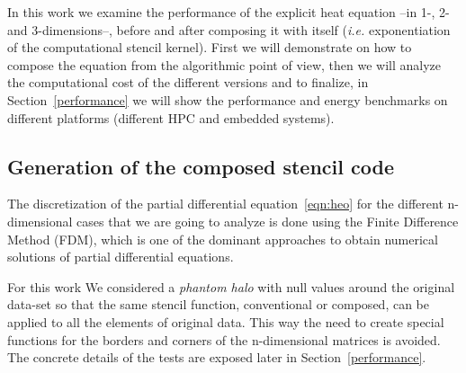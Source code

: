 \documentclass{acm_proc_article-sp}
\begin{document}
In this work we examine the performance of the explicit heat equation --in 1-, 2- and 3-dimensions--, before and after composing it with itself (\textit{i.e.} exponentiation of the computational stencil kernel). First we will demonstrate on how to compose the equation from the algorithmic point of view, then we will analyze the computational cost of the different versions and to finalize, in Section~\ref{performance} we will show the performance and energy benchmarks on different platforms (different HPC and embedded systems).

\subsection{Generation of the composed stencil code}
The discretization of the partial differential equation~\eqref{eqn:heo} for the different n-dimensional cases that we are going to analyze is done using the Finite Difference Method (FDM), which is one of the dominant approaches to obtain numerical solutions of partial differential equations\cite{grossman:ntpde}.

For this work We considered a \textit{phantom halo} with null values around the original data-set so that the same stencil function, conventional or composed, can be applied to all the elements of original data. This way the need to create special functions for the borders and corners of the n-dimensional matrices is avoided. The concrete details of the tests are exposed later in Section~\ref{performance}.
\end{document}
